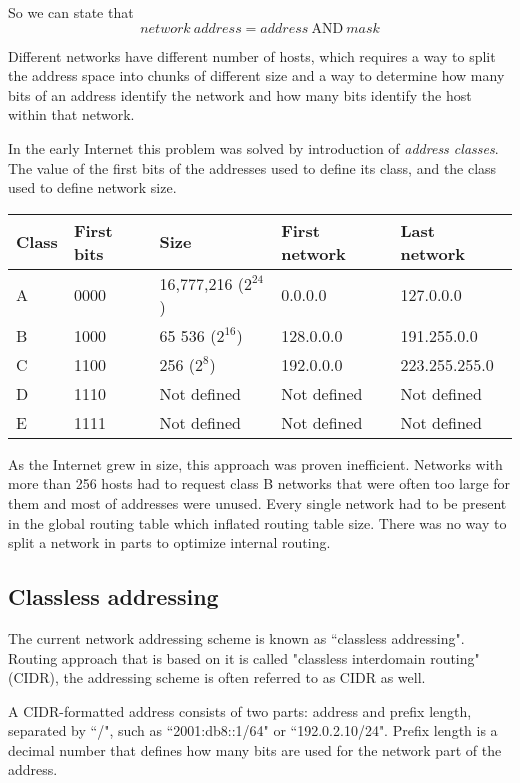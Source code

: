 So we can state that 
\begin{equation}
  network\ address = address\ \mathrm{AND}\ mask
\end{equation}

Different networks have different number of hosts, which requires a way to split the address space into chunks of
different size and a way to determine how many bits of an address identify the network and how many bits
identify the host within that network.

In the early Internet this problem was solved by introduction of \emph{address classes}. The value of the first
bits of the addresses used to define its class, and the class used to define network size.

\begin{tabular}{|l|l|l|l|l|}
\hline
Class & First bits & Size & First network & Last network \\
\hline
A & 0000 & 16,777,216 ($2^{24}$) & 0.0.0.0 & 127.0.0.0 \\
\hline
B & 1000 & 65 536 ($2^{16}$) & 128.0.0.0 & 191.255.0.0 \\
\hline
C & 1100 & 256 ($2^{8}$) & 192.0.0.0 & 223.255.255.0 \\
\hline
D & 1110 & Not defined & Not defined & Not defined \\
\hline
E & 1111 & Not defined & Not defined & Not defined \\
\hline
\end{tabular}

As the Internet grew in size, this approach was proven inefficient. Networks with more than 256 hosts had to
request class B networks that were often too large for them and most of addresses were unused. Every single
network had to be present in the global routing table which inflated routing table size. There was no way
to split a network in parts to optimize internal routing.

\subsection{Classless addressing}

The current network addressing scheme is known as ``classless addressing". Routing approach that is based on it
is called "classless interdomain routing" (CIDR), the addressing scheme is often referred to as	CIDR as well.

A CIDR-formatted address consists of two parts: address and prefix length, separated by ``/", such as 
``2001:db8::1/64" or ``192.0.2.10/24". Prefix length is a decimal number that defines how many bits are used
for the network part of the address.




